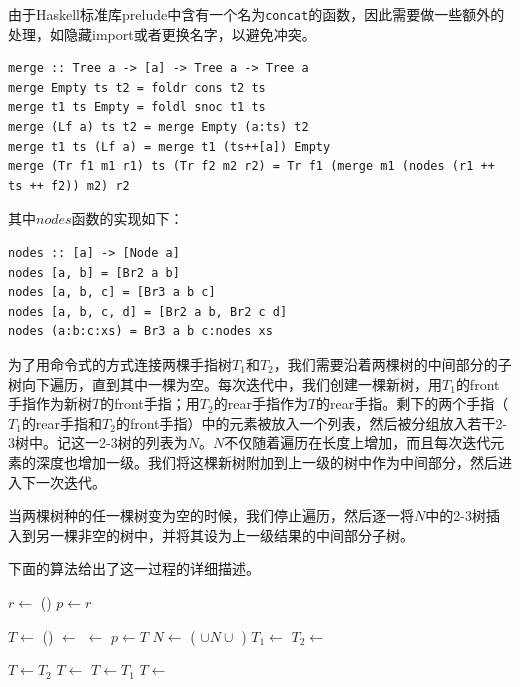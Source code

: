 \documentclass[b5paper]{ctexart}
\begin{document}
由于Haskell标准库prelude中含有一个名为\texttt{concat}的函数，因此需要做一些额外的处理，如隐藏import或者更换名字，以避免冲突。

\begin{lstlisting}[style=Haskell]
merge :: Tree a -> [a] -> Tree a -> Tree a
merge Empty ts t2 = foldr cons t2 ts
merge t1 ts Empty = foldl snoc t1 ts
merge (Lf a) ts t2 = merge Empty (a:ts) t2
merge t1 ts (Lf a) = merge t1 (ts++[a]) Empty
merge (Tr f1 m1 r1) ts (Tr f2 m2 r2) = Tr f1 (merge m1 (nodes (r1 ++ ts ++ f2)) m2) r2
\end{lstlisting}

其中$nodes$函数的实现如下：

\begin{lstlisting}[style=Haskell]
nodes :: [a] -> [Node a]
nodes [a, b] = [Br2 a b]
nodes [a, b, c] = [Br3 a b c]
nodes [a, b, c, d] = [Br2 a b, Br2 c d]
nodes (a:b:c:xs) = Br3 a b c:nodes xs
\end{lstlisting}

为了用命令式的方式连接两棵手指树$T_1$和$T_2$，我们需要沿着两棵树的中间部分的子树向下遍历，直到其中一棵为空。每次迭代中，我们创建一棵新树，用$T_1$的front手指作为新树$T$的front手指；用$T_2$的rear手指作为$T$的rear手指。剩下的两个手指（$T_1$的rear手指和$T_2$的front手指）中的元素被放入一个列表，然后被分组放入若干2-3树中。记这一2-3树的列表为$N$。$N$不仅随着遍历在长度上增加，而且每次迭代元素的深度也增加一级。我们将这棵新树附加到上一级的树中作为中间部分，然后进入下一次迭代。

当两棵树种的任一棵树变为空的时候，我们停止遍历，然后逐一将$N$中的2-3树插入到另一棵非空的树中，并将其设为上一级结果的中间部分子树。

下面的算法给出了这一过程的详细描述。

\begin{algorithmic}
  \State \Return {}
\EndFunction
\Statex
{}
  \State $r \gets$ ()
  \State $p \gets r$

    \State $T \gets$ ()
    \State {} $\gets$ 
    \State {} $\gets$ 
    \State {}
    \State $p \gets T$
    \State $N \gets$ ( $\cup N \cup$ )
    \State $T_1 \gets$ 
    \State $T_2 \gets$ 
  \EndWhile

    \State $T \gets T_2$
      \State $T \gets$ 
    \EndFor
    \State $T \gets T_1$
      \State $T \gets$ 
    \EndFor
  \EndIf
  \State {}

  \State \Return {}
\EndFunction
\end{algorithmic}
\end{document}
